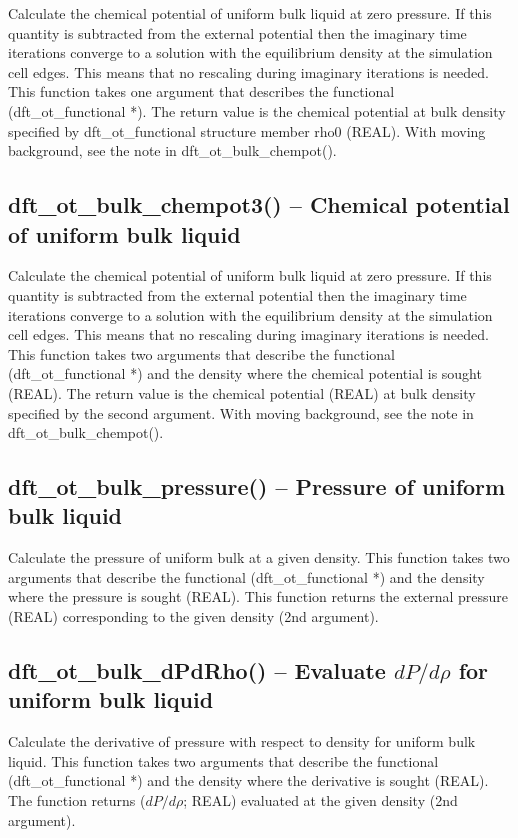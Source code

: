 \documentclass[12pt,letterpaper]{report}
\begin{document}
Calculate the chemical potential of uniform bulk liquid at zero pressure. If this quantity is subtracted from the external potential then the imaginary time iterations converge to a solution with the equilibrium density at the simulation cell edges. This means that no rescaling during imaginary iterations is needed. This function takes one argument that describes the functional (dft\_ot\_functional *). The return value is the chemical potential at bulk density specified by dft\_ot\_functional structure member rho0 (REAL). With moving background, see the note in dft\_ot\_bulk\_chempot().

\subsection{dft\_ot\_bulk\_chempot3() -- Chemical potential of uniform bulk liquid}

Calculate the chemical potential of uniform bulk liquid at zero pressure. If this quantity is subtracted from the external potential then the imaginary time iterations converge to a solution with the equilibrium density at the simulation cell edges. This means that no rescaling during imaginary iterations is needed. This function takes two arguments that describe the functional (dft\_ot\_functional *) and the density where the chemical potential is sought (REAL). The return value is the chemical potential (REAL) at bulk density specified by the second argument. With moving background, see the note in dft\_ot\_bulk\_chempot().

\subsection{dft\_ot\_bulk\_pressure() -- Pressure of uniform bulk liquid}

Calculate the pressure of uniform bulk at a given density. This function takes two arguments that describe the functional (dft\_ot\_functional *) and the density where the pressure is sought (REAL). This function returns the external pressure (REAL) corresponding to the given density (2nd argument).

\subsection{dft\_ot\_bulk\_dPdRho() -- Evaluate $dP/d\rho$ for uniform bulk liquid}

Calculate the derivative of pressure with respect to density for uniform bulk liquid. This function takes two arguments that describe the functional (dft\_ot\_functional *) and the density where the derivative is sought (REAL). The function returns ($dP/d\rho$; REAL) evaluated at the given density (2nd argument).
\end{document}
